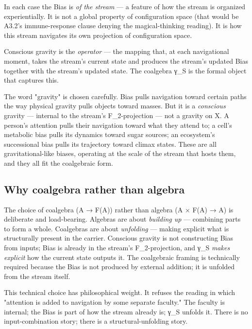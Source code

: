 \documentclass[11pt, openany]{book}
\begin{document}
In each case the Bias is \textit{of the stream} --- a feature of how the stream is organized experientially. It is not a global property of configuration space (that would be A3.2's immune-response clause denying the magical-thinking reading). It is how this stream navigates its own projection of configuration space.

Conscious gravity is the \textit{operator} --- the mapping that, at each navigational moment, takes the stream's current state and produces the stream's updated Bias together with the stream's updated state. The coalgebra γ\_\allowbreak{}S is the formal object that captures this.

The word "gravity" is chosen carefully. Bias pulls navigation toward certain paths the way physical gravity pulls objects toward masses. But it is a \textit{conscious} gravity --- internal to the stream's F\_\allowbreak{}2-projection --- not a gravity on X. A person's attention pulls their navigation toward what they attend to; a cell's metabolic bias pulls its dynamics toward sugar sources; an ecosystem's successional bias pulls its trajectory toward climax states. These are all gravitational-like biases, operating at the scale of the stream that hosts them, and they all fit the coalgebraic form.

\subsection{Why coalgebra rather than algebra}

The choice of coalgebra (A → F(A)) rather than algebra (A × F(A) → A) is deliberate and load-bearing. Algebras are about \textit{building up} --- combining parts to form a whole. Coalgebras are about \textit{unfolding} --- making explicit what is structurally present in the carrier. Conscious gravity is not constructing Bias from inputs; Bias is already in the stream's F\_\allowbreak{}2-projection, and γ\_\allowbreak{}S \textit{makes explicit} how the current state outputs it. The coalgebraic framing is technically required because the Bias is not produced by external addition; it is unfolded from the stream itself.

This technical choice has philosophical weight. It refuses the reading in which "attention is added to navigation by some separate faculty." The faculty is internal; the Bias is part of how the stream already is; γ\_\allowbreak{}S unfolds it. There is no input-combination story; there is a structural-unfolding story.
\end{document}
